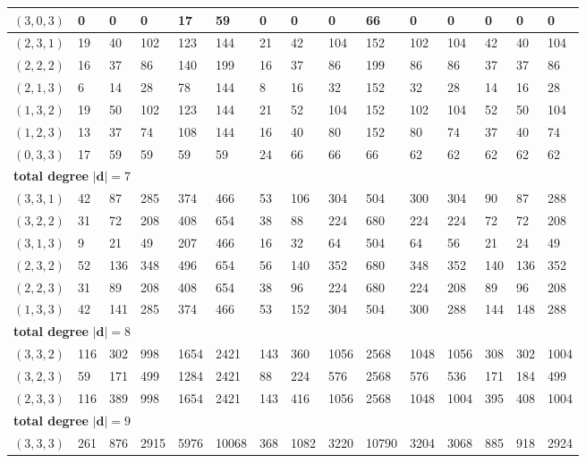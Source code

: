 \documentclass{article}
\newcommand{\bd}{\mathbf{d}}
\begin{document}
\begin{longtable}{|l|l|l|l|l|l|l|l|l|l|l|l|l|l|l|}
$(3,0,3)$ & 0 & 0 & 0 & 17 & 59 & 0 & 0 & 0 & 66 & 0 & 0 & 0 & 0 & 0 \\ \hline
$(2,3,1)$ & 19 & 40 & 102 & 123 & 144 & 21 & 42 & 104 & 152 & 102 & 104 & 42 & 40 & 104 \\ \hline
$(2,2,2)$ & 16 & 37 & 86 & 140 & 199 & 16 & 37 & 86 & 199 & 86 & 86 & 37 & 37 & 86 \\ \hline
$(2,1,3)$ & 6 & 14 & 28 & 78 & 144 & 8 & 16 & 32 & 152 & 32 & 28 & 14 & 16 & 28 \\ \hline
$(1,3,2)$ & 19 & 50 & 102 & 123 & 144 & 21 & 52 & 104 & 152 & 102 & 104 & 52 & 50 & 104 \\ \hline
$(1,2,3)$ & 13 & 37 & 74 & 108 & 144 & 16 & 40 & 80 & 152 & 80 & 74 & 37 & 40 & 74 \\ \hline
$(0,3,3)$ & 17 & 59 & 59 & 59 & 59 & 24 & 66 & 66 & 66 & 62 & 62 & 62 & 62 & 62 \\ \hline
\multicolumn{15}{|l|}{\textbf{total degree }$|\bd|=7$} \\ \hline
$(3,3,1)$ & 42 & 87 & 285 & 374 & 466 & 53 & 106 & 304 & 504 & 300 & 304 & 90 & 87 & 288 \\ \hline
$(3,2,2)$ & 31 & 72 & 208 & 408 & 654 & 38 & 88 & 224 & 680 & 224 & 224 & 72 & 72 & 208 \\ \hline
$(3,1,3)$ & 9 & 21 & 49 & 207 & 466 & 16 & 32 & 64 & 504 & 64 & 56 & 21 & 24 & 49 \\ \hline
$(2,3,2)$ & 52 & 136 & 348 & 496 & 654 & 56 & 140 & 352 & 680 & 348 & 352 & 140 & 136 & 352 \\ \hline
$(2,2,3)$ & 31 & 89 & 208 & 408 & 654 & 38 & 96 & 224 & 680 & 224 & 208 & 89 & 96 & 208 \\ \hline
$(1,3,3)$ & 42 & 141 & 285 & 374 & 466 & 53 & 152 & 304 & 504 & 300 & 288 & 144 & 148 & 288 \\ \hline
\multicolumn{15}{|l|}{\textbf{total degree }$|\bd|=8$} \\ \hline
$(3,3,2)$ & 116 & 302 & 998 & 1654 & 2421 & 143 & 360 & 1056 & 2568 & 1048 & 1056 & 308 & 302 & 1004 \\ \hline
$(3,2,3)$ & 59 & 171 & 499 & 1284 & 2421 & 88 & 224 & 576 & 2568 & 576 & 536 & 171 & 184 & 499 \\ \hline
$(2,3,3)$ & 116 & 389 & 998 & 1654 & 2421 & 143 & 416 & 1056 & 2568 & 1048 & 1004 & 395 & 408 & 1004 \\ \hline
\multicolumn{15}{|l|}{\textbf{total degree }$|\bd|=9$} \\ \hline
$(3,3,3)$ & 261 & 876 & 2915 & 5976 & 10068 & 368 & 1082 & 3220 & 10790 & 3204 & 3068 & 885 & 918 & 2924 \\ \hline
\end{longtable}
\end{document}
